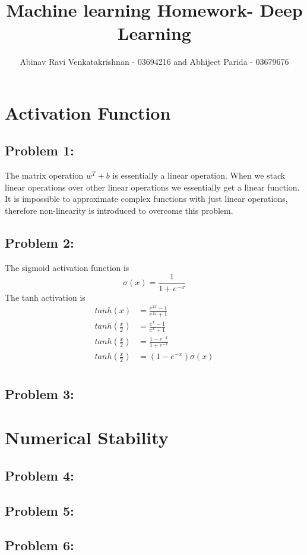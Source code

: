 \documentclass[5pt,a4paper]{article}
\begin{document}
	\title{Machine learning Homework- Deep Learning }
	\author{Abinav Ravi Venkatakrishnan - 03694216 and Abhijeet Parida - 03679676}
	\maketitle
	\section{Activation Function}
	\subsection*{Problem 1:}
	The matrix operation $w^T+b$ is essentially a linear operation. When we stack linear operations over other linear operations we essentially get a linear function. It is impossible to approximate complex functions with just linear operations, therefore non-linearity is introduced to overcome this problem.
	
	\subsection*{Problem 2:}
	The sigmoid activation function is \\
	\begin{equation*}
	\sigma(x)=\frac{1}{1+e^{-x}}
	\end{equation*}
	The tanh activation is\\
	\begin{eqnarray*}
	tanh(x)&=\frac{e^{2x}-1}{e^{2x}+1}\\
	tanh(\frac{x}{2})&=\frac{e^{x}-1}{e^{x}+1}\\
	tanh(\frac{x}{2})&=\frac{1-e^{-x}}{1+e^{-x}}\\
	tanh(\frac{x}{2})&=(1-e^{-x})\sigma(x)\\
	\end{eqnarray*}
	
	\subsection*{Problem 3:}
	
	\section{ Numerical Stability}
	\subsection*{Problem 4:}
	
	\subsection*{Problem 5:}
	\subsection*{Problem 6:}
	
	
\end{document}
